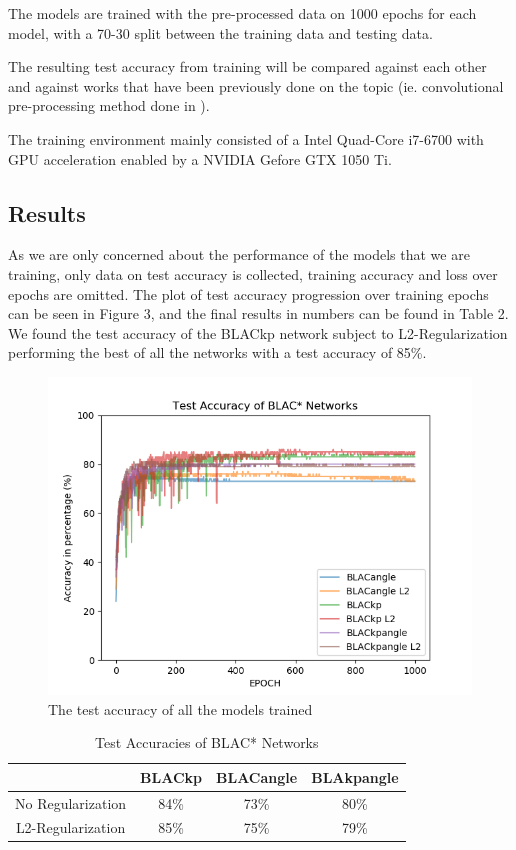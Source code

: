 \documentclass{article}
\begin{document}
The models are trained with the pre-processed data on 1000 epochs for each model, with a 70-30 split between the training data and testing data.

The resulting test accuracy from training will be compared against each other and against works that have been previously done on the topic (ie. convolutional pre-processing method done in \citep{stienen2012computational} \citep{schindler2008recognizing}).

The training environment mainly consisted of a Intel Quad-Core i7-6700 with GPU acceleration enabled by a NVIDIA Gefore GTX 1050 Ti.

\subsection{Results}

As we are only concerned about the performance of the models that we are training, only data on test accuracy is collected, training accuracy and loss over epochs are omitted. The plot of test accuracy progression over training epochs can be seen in Figure 3, and the final results in numbers can be found in Table 2. We found the test accuracy of the BLACkp network subject to L2-Regularization performing the best of all the networks with a test accuracy of 85\%. 

\begin{figure}[h]
\centering
\includegraphics[scale=0.5]{te_acc}
\caption{The test accuracy of all the models trained}
\end{figure}

\begin{table}[h]
	\caption{Test Accuracies of BLAC* Networks}
	\centering
	\begin{tabular}{c|ccc}
	\toprule
	& BLACkp & BLACangle & BLAkpangle \\
	\midrule	
	No Regularization & 84\% & 73\% & 80\%\\
	\midrule
	L2-Regularization & 85\% & 75\% & 79\%\\
	\end{tabular}
\end{table}
\end{document}
